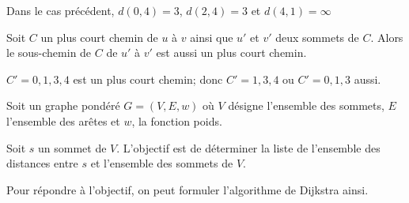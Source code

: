 \begin{exemple}
Dans le cas précédent, $d(0,4)=3$, 
$d(2,4)=3$ et $d(4,1)=\infty$
\end{exemple}

\begin{prop}
Soit $C$ un plus court chemin de $u$ à $v$ ainsi que $u'$ et $v'$ deux sommets de $C$. Alors le sous-chemin de $C$ de $u'$ à $v'$ est aussi un plus court chemin.
\end{prop}


\begin{exemple}
$C' = 0, 1,3,4$ est un plus court chemin; donc $C' = 1,3,4$ ou $C' = 0, 1,3$ aussi. 
\end{exemple}

\begin{obj}
Soit un graphe pondéré $G=\left(V, E, w\right)$ où $V$ désigne l'ensemble des sommets, $E$ l'ensemble des arêtes et 
$w$, la fonction poids.

Soit $s$ un sommet de $V$. L'objectif est de déterminer la liste de l'ensemble des distances entre $s$ et l'ensemble des sommets de $V$.
\end{obj}


Pour répondre à l'objectif, on peut formuler l'algorithme de Dijkstra ainsi. 



